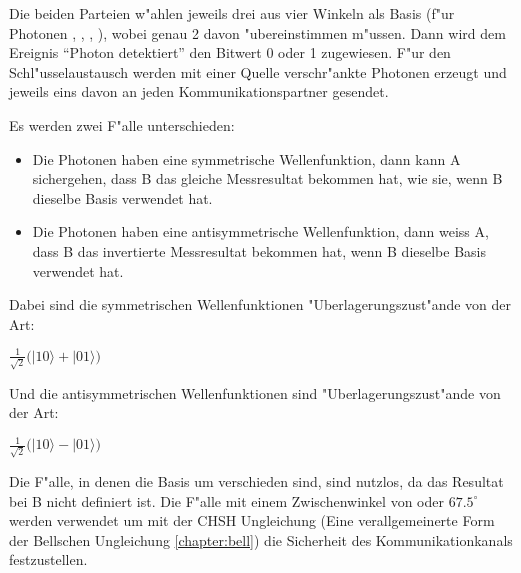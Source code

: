 
  Die beiden Parteien w"ahlen jeweils drei aus vier Winkeln als Basis (f"ur Photonen \qcste, \qcstz, \qcstd, \qcstv), wobei genau 2 davon "ubereinstimmen m"ussen.
  Dann wird dem Ereignis ``Photon detektiert'' den Bitwert 0 oder 1 zugewiesen.
  F"ur den Schl"usselaustausch werden mit einer Quelle verschr"ankte Photonen erzeugt und
  jeweils eins davon an jeden Kommunikationspartner gesendet.

  Es werden zwei F"alle unterschieden:
  \begin{itemize}
      \item Die Photonen haben eine symmetrische Wellenfunktion, dann kann A sichergehen, dass B das gleiche Messresultat bekommen hat, wie sie, wenn B dieselbe Basis verwendet hat.
      \item  Die Photonen haben eine antisymmetrische Wellenfunktion, dann weiss A, dass B das invertierte Messresultat bekommen hat, wenn B dieselbe Basis verwendet hat.
  \end{itemize}

  Dabei sind die symmetrischen Wellenfunktionen "Uberlagerungszust"ande von der Art:

  $\frac{1}{\sqrt{2}}\big(|10\rangle+|01\rangle\big)$

  Und die antisymmetrischen Wellenfunktionen sind "Uberlagerungszust"ande von der Art:

  $\frac{1}{\sqrt{2}}\big(|10\rangle-|01\rangle\big)$


  Die F"alle, in denen die Basis um \qcstv verschieden sind, sind nutzlos, da das Resultat bei B nicht definiert ist.
  Die F"alle mit einem Zwischenwinkel von \qcstd oder $67.5^{\circ}$ werden verwendet um mit der CHSH Ungleichung (Eine verallgemeinerte Form der Bellschen Ungleichung \ref{chapter:bell}) die Sicherheit des Kommunikationkanals festzustellen.
